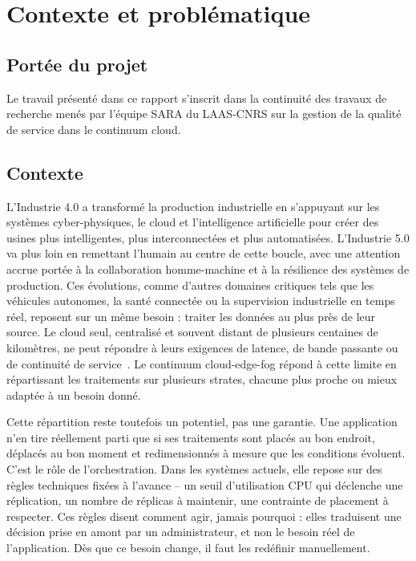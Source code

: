\section{Contexte et problématique}
\label{sec:problematique}

\subsection{Portée du projet}

Le travail présenté dans ce rapport s'inscrit dans la continuité des travaux de recherche menés par l'équipe SARA du LAAS-CNRS sur la gestion de la qualité de service dans le continuum cloud.

\subsection{Contexte}

L'Industrie 4.0 a transformé la production industrielle en s'appuyant sur les systèmes cyber-physiques, le cloud et l'intelligence artificielle pour créer des usines plus intelligentes, plus interconnectées et plus automatisées. L'Industrie 5.0 va plus loin en remettant l'humain au centre de cette boucle, avec une attention accrue portée à la collaboration homme-machine et à la résilience des systèmes de production. Ces évolutions, comme d'autres domaines critiques tels que les véhicules autonomes, la santé connectée ou la supervision industrielle en temps réel, reposent sur un même besoin : traiter les données au plus près de leur source. Le cloud seul, centralisé et souvent distant de plusieurs centaines de kilomètres, ne peut répondre à leurs exigences de latence, de bande passante ou de continuité de service~\cite{sfaxi2026policies}. Le continuum cloud-edge-fog répond à cette limite en répartissant les traitements sur plusieurs strates, chacune plus proche ou mieux adaptée à un besoin donné.

Cette répartition reste toutefois un potentiel, pas une garantie. Une application n'en tire réellement parti que si ses traitements sont placés au bon endroit, déplacés au bon moment et redimensionnés à mesure que les conditions évoluent. C'est le rôle de l'orchestration. Dans les systèmes actuels, elle repose sur des règles techniques fixées à l'avance -- un seuil d'utilisation CPU qui déclenche une réplication, un nombre de réplicas à maintenir, une contrainte de placement à respecter. Ces règles disent comment agir, jamais pourquoi : elles traduisent une décision prise en amont par un administrateur, et non le besoin réel de l'application. Dès que ce besoin change, il faut les redéfinir manuellement.

